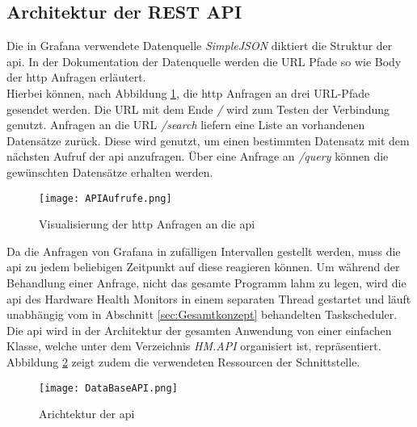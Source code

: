\subsection{Architektur der REST API}
Die in Grafana verwendete Datenquelle \textit{SimpleJSON} diktiert die Struktur der \ac{api}. In der Dokumentation der Datenquelle \cite{SimpleJSON} werden die URL Pfade so wie Body der \acs{http} Anfragen erläutert.\\
Hierbei können, nach Abbildung \ref{fig:APIAnfragen}, die \ac{http} Anfragen an drei URL-Pfade gesendet werden. Die URL mit dem Ende \glqq\textit{/}\grqq{} wird zum Testen der Verbindung genutzt. Anfragen an die URL \glqq\textit{/search}\grqq{} liefern eine Liste an vorhandenen Datensätze zurück. Diese wird genutzt, um einen bestimmten Datensatz mit dem nächsten Aufruf der \ac{api} anzufragen. Über eine Anfrage an \glqq\textit{/query}\grqq{} können die gewünschten Datensätze erhalten werden.\\
\begin{center}
    \begin{figure}[h!]
        \captionsetup{justification=centering,format=plain, font=small}
        \centering
        \texttt{[image: APIAufrufe.png]}
        \caption{Visualisierung der \ac{http} Anfragen an die \ac{api}}
        \label{fig:APIAnfragen}
    \end{figure}
\end{center}
\vspace{-1.8cm}
Da die Anfragen von Grafana in zufälligen Intervallen gestellt werden, muss die \ac{api} zu jedem beliebigen Zeitpunkt auf diese reagieren können. Um während der Behandlung einer Anfrage, nicht das gesamte Programm lahm zu legen, wird die \ac{api} des Hardware Health Monitors in einem separaten Thread gestartet und läuft unabhängig vom in Abschnitt \ref{sec:Gesamtkonzept} behandelten Taskscheduler.\\
Die \ac{api} wird in der Architektur der gesamten Anwendung von einer einfachen Klasse, welche unter dem Verzeichnis \textit{HM.API} organisiert ist, repräsentiert. Abbildung \ref{fig:UMLAPI} zeigt zudem die verwendeten Ressourcen der Schnittstelle. 
\begin{center}
    \begin{figure}[h!]
        \captionsetup{justification=centering,format=plain, font=small}
        \centering
        \texttt{[image: DataBaseAPI.png]}
        \caption{Arichtektur der \ac{api}}
        \label{fig:UMLAPI}
    \end{figure}
\end{center}
\vspace{-1.8cm}